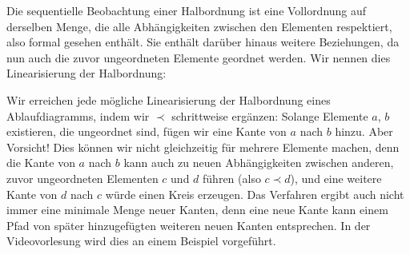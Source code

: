 \pagebreak %

Die sequentielle Beobachtung einer Halbordnung ist eine Vollordnung auf derselben Menge, die alle Abhängigkeiten zwischen den Elementen respektiert, 
also formal gesehen enthält. Sie enthält darüber hinaus weitere Beziehungen, da nun auch die zuvor ungeordneten Elemente geordnet werden. Wir nennen dies Linearisierung der Halbordnung:


Wir erreichen jede mögliche Linearisierung der Halbordnung eines Ablaufdiagramms, indem wir $\prec$ schrittweise ergänzen: Solange Elemente $a$, $b$ existieren, die ungeordnet sind, fügen wir eine Kante von $a$ nach $b$ hinzu. Aber Vorsicht! Dies können wir nicht gleichzeitig für mehrere Elemente machen, denn die Kante von $a$ nach $b$ kann auch zu neuen Abhängigkeiten zwischen anderen, zuvor ungeordneten Elementen $c$ und $d$ führen (also $c\prec d$), und eine weitere Kante von $d$ nach $c$ würde einen Kreis erzeugen. Das Verfahren ergibt auch nicht immer eine minimale Menge neuer Kanten, denn eine neue Kante kann einem Pfad von später hinzugefügten weiteren neuen Kanten entsprechen. In der Videovorlesung wird dies an einem Beispiel vorgeführt.
